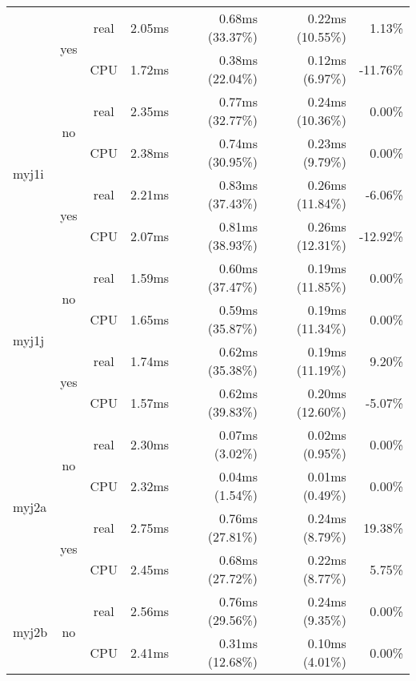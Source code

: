 \documentclass[en]{pracamgr}
\begin{document}
\begin{appendices}
\begin{small}
\begin{longtable}{|l|c|c|r|r|r|r|}
                          \cline{2-7}
                          & \multirow{2}{*}{yes} & real & 2.05ms & 0.68ms (33.37\%) & 0.22ms (10.55\%) & 1.13\% \\*
                          &                      & CPU  & 1.72ms & 0.38ms (22.04\%) & 0.12ms (6.97\%) & -11.76\% \\
\hline
\multirow{4}{*}{myj1i}    & \multirow{2}{*}{no}  & real & 2.35ms & 0.77ms (32.77\%) & 0.24ms (10.36\%) & 0.00\% \\*
                          &                      & CPU  & 2.38ms & 0.74ms (30.95\%) & 0.23ms (9.79\%) & 0.00\% \\*
                          \cline{2-7}
                          & \multirow{2}{*}{yes} & real & 2.21ms & 0.83ms (37.43\%) & 0.26ms (11.84\%) & -6.06\% \\*
                          &                      & CPU  & 2.07ms & 0.81ms (38.93\%) & 0.26ms (12.31\%) & -12.92\% \\
\hline
\multirow{4}{*}{myj1j}    & \multirow{2}{*}{no}  & real & 1.59ms & 0.60ms (37.47\%) & 0.19ms (11.85\%) & 0.00\% \\*
                          &                      & CPU  & 1.65ms & 0.59ms (35.87\%) & 0.19ms (11.34\%) & 0.00\% \\*
                          \cline{2-7}
                          & \multirow{2}{*}{yes} & real & 1.74ms & 0.62ms (35.38\%) & 0.19ms (11.19\%) & 9.20\% \\*
                          &                      & CPU  & 1.57ms & 0.62ms (39.83\%) & 0.20ms (12.60\%) & -5.07\% \\
\hline
\multirow{4}{*}{myj2a}    & \multirow{2}{*}{no}  & real & 2.30ms & 0.07ms (3.02\%) & 0.02ms (0.95\%) & 0.00\% \\*
                          &                      & CPU  & 2.32ms & 0.04ms (1.54\%) & 0.01ms (0.49\%) & 0.00\% \\*
                          \cline{2-7}
                          & \multirow{2}{*}{yes} & real & 2.75ms & 0.76ms (27.81\%) & 0.24ms (8.79\%) & 19.38\% \\*
                          &                      & CPU  & 2.45ms & 0.68ms (27.72\%) & 0.22ms (8.77\%) & 5.75\% \\
\hline
\multirow{4}{*}{myj2b}    & \multirow{2}{*}{no}  & real & 2.56ms & 0.76ms (29.56\%) & 0.24ms (9.35\%) & 0.00\% \\*
                          &                      & CPU  & 2.41ms & 0.31ms (12.68\%) & 0.10ms (4.01\%) & 0.00\% \\*

\end{longtable}
\end{small}
\end{appendices}
\end{document}
